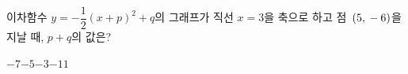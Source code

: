 이차함수 $y=-\dfrac{1}{2}(x+p)^2+q$의 그래프가 직선 $x=3$을 축으로 하고 점~$(5{,}\mkern3mu -6)$을 지날 때, $p+q$의 값은? 
\begin{choices32}{$-7$}{$-5$}{$-3$}{$-1$}{$1$}\end{choices32}

